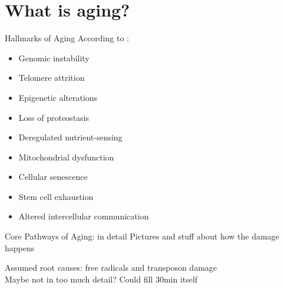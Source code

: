 \section{What is aging?}


\begin{frame}[c]{Hallmarks of Aging}
    According to \cite{lopez2013hallmarks}:
    \begin{itemize}[<+(1)->]
        \item Genomic instability
        \item Telomere attrition
        \item Epigenetic alterations
        \item Loss of proteostasis
        \item Deregulated nutrient-sensing
        \item Mitochondrial dysfunction
        \item Cellular senescence
        \item Stem cell exhaustion
        \item Altered intercellular communication
    \end{itemize}
\end{frame}


\begin{frame}[c]{Core Pathways of Aging: in detail}
    Pictures and stuff about how the damage happens
\end{frame}


\begin{frame}[c]
    Assumed root causes: free radicals and transposon damage \\
    Maybe not in too much detail? Could fill 30min itself
\end{frame}
